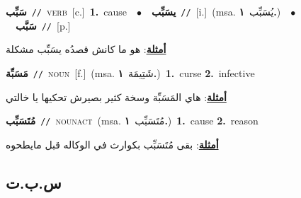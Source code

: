 \documentclass[10pt,a4paper,twoside]{article} %
\begin{document}
\begin{multicols}{2}
{{\setlength\topsep{0pt}\textbf{\foreignlanguage{arabic}{سَبِّب}}\ {\color{gray}\texttt{//}\color{black}}\ \textsc{verb}\ [c.]\ \textbf{1.}~cause\ \ $\bullet$\ \ \setlength\topsep{0pt}\textbf{\foreignlanguage{arabic}{يسَبِّب}}\ {\color{gray}\texttt{//}\color{black}}\ [i.]\ \color{gray}(msa. \foreignlanguage{arabic}{يُسَبِّب}~\foreignlanguage{arabic}{\textbf{١.}})\color{black}\ \ $\bullet$\ \ \setlength\topsep{0pt}\textbf{\foreignlanguage{arabic}{سَبَّب}}\ {\color{gray}\texttt{//}\color{black}}\ [p.]\  \begin{flushright}\color{gray}\foreignlanguage{arabic}{\textbf{\underline{\foreignlanguage{arabic}{أمثلة}}}: هو ما كانش قصدُه يسَبِّب مشكلة}\end{flushright}\color{black}} \vspace{2mm}

{\setlength\topsep{0pt}\textbf{\foreignlanguage{arabic}{مَسَبِّة}}\ {\color{gray}\texttt{//}\color{black}}\ \textsc{noun}\ [f.]\ \color{gray}(msa. \foreignlanguage{arabic}{شَتِيمَة}~\foreignlanguage{arabic}{\textbf{١.}})\color{black}\ \textbf{1.}~curse  \textbf{2.}~infective\  \begin{flushright}\color{gray}\foreignlanguage{arabic}{\textbf{\underline{\foreignlanguage{arabic}{أمثلة}}}: هاي المَسَبِّة وسخة كثير بصيرش تحكيها يا خالتي}\end{flushright}\color{black}} \vspace{2mm}

{\setlength\topsep{0pt}\textbf{\foreignlanguage{arabic}{مُتَسَبِّب}}\ {\color{gray}\texttt{//}\color{black}}\ \textsc{noun\textunderscore act}\ \color{gray}(msa. \foreignlanguage{arabic}{مُتَسَبِّب}~\foreignlanguage{arabic}{\textbf{١.}})\color{black}\ \textbf{1.}~cause  \textbf{2.}~reason\  \begin{flushright}\color{gray}\foreignlanguage{arabic}{\textbf{\underline{\foreignlanguage{arabic}{أمثلة}}}: بقى مُتَسَبِّب بكوارث في الوكاله قبل مايطحوه}\end{flushright}\color{black}} \vspace{2mm}

\vspace{-3mm}
\subsection*{\color{blue}\foreignlanguage{arabic}{س.ب.ت}\color{blue}{}} 

}
\end{multicols}
\end{document}
